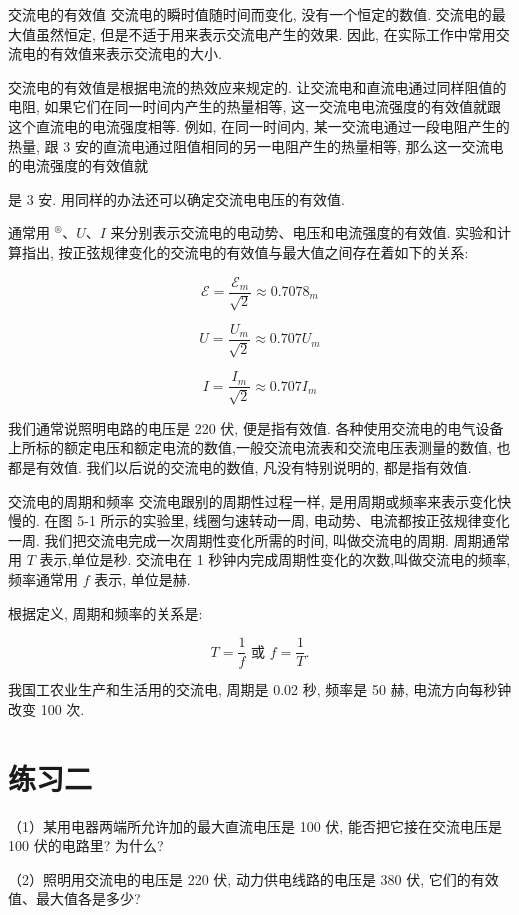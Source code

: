 \documentclass[10pt]{article}
\begin{document}
交流电的有效值 交流电的瞬时值随时间而变化, 没有一个恒定的数值. 交流电的最大值虽然恒定, 但是不适于用来表示交流电产生的效果. 因此, 在实际工作中常用交流电的有效值来表示交流电的大小.

交流电的有效值是根据电流的热效应来规定的. 让交流电和直流电通过同样阻值的电阻, 如果它们在同一时间内产生的热量相等, 这一交流电电流强度的有效值就跟这个直流电的电流强度相等. 例如, 在同一时间内, 某一交流电通过一段电阻产生的热量, 跟 3 安的直流电通过阻值相同的另一电阻产生的热量相等, 那么这一交流电的电流强度的有效值就

是 3 安. 用同样的办法还可以确定交流电电压的有效值.

通常用 \({}^{\circledR }\text{、}U\text{、}I\) 来分别表示交流电的电动势、电压和电流强度的有效值. 实验和计算指出, 按正弦规律变化的交流电的有效值与最大值之间存在着如下的关系:

\[
\mathcal{E} = \frac{{\mathcal{E}}_{m}}{\sqrt{2}} \approx {0.7078}_{m}
\]

\[
U = \frac{{U}_{m}}{\sqrt{2}} \approx {0.707}{U}_{m}
\]

\[
I = \frac{{I}_{m}}{\sqrt{2}} \approx {0.707}{I}_{m}
\]

我们通常说照明电路的电压是 220 伏, 便是指有效值. 各种使用交流电的电气设备上所标的额定电压和额定电流的数值,一般交流电流表和交流电压表测量的数值, 也都是有效值. 我们以后说的交流电的数值, 凡没有特别说明的, 都是指有效值.

交流电的周期和频率 交流电跟别的周期性过程一样, 是用周期或频率来表示变化快慢的. 在图 5-1 所示的实验里, 线圈匀速转动一周, 电动势、电流都按正弦规律变化一周. 我们把交流电完成一次周期性变化所需的时间, 叫做交流电的周期. 周期通常用 \(T\) 表示,单位是秒. 交流电在 1 秒钟内完成周期性变化的次数,叫做交流电的频率,频率通常用 \(f\) 表示, 单位是赫.

根据定义, 周期和频率的关系是:

\[
T = \frac{1}{f}\text{ 或 }f = \frac{1}{T}.
\]

我国工农业生产和生活用的交流电, 周期是 0.02 秒, 频率是 50 赫, 电流方向每秒钟改变 100 次.

\section*{练习二}

（1）某用电器两端所允许加的最大直流电压是 100 伏, 能否把它接在交流电压是 100 伏的电路里? 为什么?

（2）照明用交流电的电压是 220 伏, 动力供电线路的电压是 380 伏, 它们的有效值、最大值各是多少?
\end{document}
